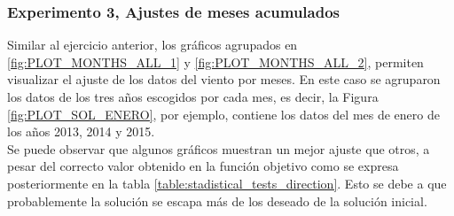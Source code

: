 \subsubsection{Experimento 3, Ajustes de meses acumulados}
Similar al ejercicio anterior, los gráficos agrupados en \ref{fig:PLOT_MONTHS_ALL_1} y \ref{fig:PLOT_MONTHS_ALL_2}, permiten visualizar el ajuste de los datos del viento por meses. En este caso se agruparon los datos de los tres años escogidos por cada mes, es decir, la Figura \ref{fig:PLOT_SOL_ENERO}, por ejemplo, contiene los datos del mes de enero de los años 2013, 2014 y 2015.\\
Se puede observar que algunos gráficos muestran un mejor ajuste que otros, a pesar del correcto valor obtenido en la función objetivo como se expresa posteriormente en la tabla \ref{table:stadistical_tests_direction}. Esto se debe a que probablemente la solución se escapa más de los deseado de la solución inicial. 
